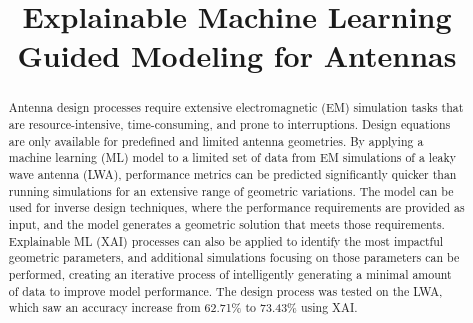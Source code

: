 \documentclass[conference]{IEEEtran}
\begin{document}
\title{Explainable Machine Learning Guided Modeling for Antennas\\
}

\author{
\and
{}
\and
{}
\and
{}
}

\maketitle

\begin{abstract}
Antenna design processes require extensive electromagnetic (EM) simulation tasks that are resource-intensive, time-consuming, and prone to interruptions. Design equations are only available for predefined and limited antenna geometries. By applying a machine learning (ML) model to a limited set of data from EM simulations of a leaky wave antenna (LWA), performance metrics can be predicted significantly quicker than running simulations for an extensive range of geometric variations. The model can be used for inverse design techniques, where the performance requirements are provided as input, and the model generates a geometric solution that meets those requirements. Explainable ML (XAI) processes can also be applied to identify the most impactful geometric parameters, and additional simulations focusing on those parameters can be performed, creating an iterative process of intelligently generating a minimal amount of data to improve model performance. The design process was tested on the LWA, which saw an accuracy increase from 62.71\% to 73.43\% using XAI.
\end{abstract}
\end{document}
